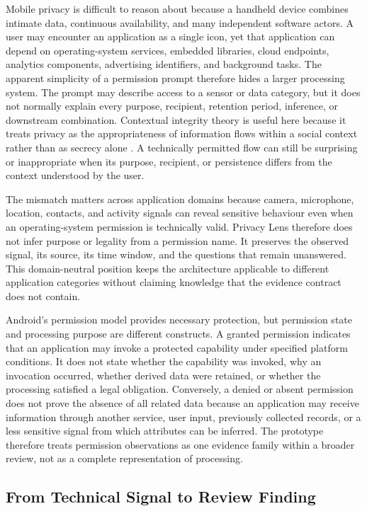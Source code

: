 Mobile privacy is difficult to reason about because a handheld device combines intimate data, continuous availability, and many independent software actors. A user may encounter an application as a single icon, yet that application can depend on operating-system services, embedded libraries, cloud endpoints, analytics components, advertising identifiers, and background tasks. The apparent simplicity of a permission prompt therefore hides a larger processing system. The prompt may describe access to a sensor or data category, but it does not normally explain every purpose, recipient, retention period, inference, or downstream combination. Contextual integrity theory is useful here because it treats privacy as the appropriateness of information flows within a social context rather than as secrecy alone \cite{5}. A technically permitted flow can still be surprising or inappropriate when its purpose, recipient, or persistence differs from the context understood by the user.

The mismatch matters across application domains because camera, microphone, location, contacts, and activity signals can reveal sensitive behaviour even when an operating-system permission is technically valid. Privacy Lens therefore does not infer purpose or legality from a permission name. It preserves the observed signal, its source, its time window, and the questions that remain unanswered. This domain-neutral position keeps the architecture applicable to different application categories without claiming knowledge that the evidence contract does not contain.

Android's permission model provides necessary protection, but permission state and processing purpose are different constructs. A granted permission indicates that an application may invoke a protected capability under specified platform conditions. It does not state whether the capability was invoked, why an invocation occurred, whether derived data were retained, or whether the processing satisfied a legal obligation. Conversely, a denied or absent permission does not prove the absence of all related data because an application may receive information through another service, user input, previously collected records, or a less sensitive signal from which attributes can be inferred. The prototype therefore treats permission observations as one evidence family within a broader review, not as a complete representation of processing.

\subsection{From Technical Signal to Review Finding}

